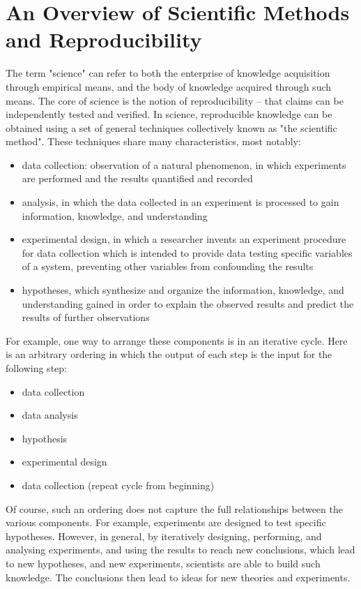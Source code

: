\documentclass[a4paper]{report}
\begin{document}
\section{An Overview of Scientific Methods and Reproducibility}
The term "science" can refer to both the enterprise of knowledge acquisition 
through empirical means, and the body of knowledge acquired through such means. 
The core of science is the notion of reproducibility -- that claims can be 
independently tested and verified.  In science, reproducible knowledge can be 
obtained using a set of general techniques collectively known as "the 
scientific method".  These techniques share many characteristics, most notably:
\begin{itemize}
 \item data collection: observation of a natural phenomenon, in which 
 experiments are performed and the results quantified and recorded
 \item analysis, in which the data collected in an experiment is processed to 
 gain information, knowledge, and understanding
 \item experimental design, in which a researcher invents an experiment 
 procedure for data collection which is intended to provide data testing 
 specific variables of a system, preventing other variables from confounding 
 the results
 \item hypotheses, which synthesize and organize the information, knowledge, 
 and understanding gained in order to explain the observed results and predict 
 the results of further observations
\end{itemize}

For example, one way to arrange these components is in an iterative cycle.  
Here is an arbitrary ordering in which the output of each step is the input 
for the following step:
\begin{itemize}
  \item data collection
  \item data analysis
  \item hypothesis
  \item experimental design
  \item data collection (repeat cycle from beginning)
\end{itemize}

Of course, such an ordering does not capture the full relationships between 
the various components.  For example, experiments are designed to test 
specific hypotheses.  However, in general, by iteratively designing, 
performing, and analysing experiments, and using the results to reach new 
conclusions, which lead to new hypotheses, and new experiments, scientists 
are able to build such knowledge.  The conclusions then lead to ideas for 
new theories and experiments.  
\end{document}
